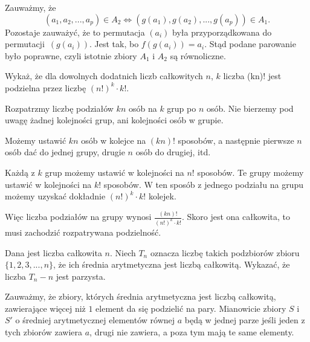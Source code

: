 Zauważmy, że
\[
	(a_1, a_2, ..., a_p) \in A_2 \iff (g(a_1), g(a_2), ..., g(a_p)) \in A_1.
\] 
Pozostaje zauważyć, że to permutacja $(a_i)$ była przyporządkowana do permutacji~$(g(a_i))$. Jest tak, bo $f(g(a_i)) = a_i$. Stąd podane parowanie było poprawne, czyli istotnie zbiory $A_1$ i $A_2$ są równoliczne.


\vspace{5px}

\begin{problem}{5}
	Wykaż, że dla dowolnych dodatnich liczb całkowitych $n$, $k$ liczba	(kn)!
	jest podzielna przez liczbę $(n!)^k \cdot k!$.
\end{problem}

\vspace{5px}

\noindent
Rozpatrzmy liczbę podziałów $kn$ osób na $k$ grup po $n$ osób. Nie bierzemy pod uwagę żadnej kolejności grup, ani kolejności osób w grupie. 

Możemy ustawić $kn$ osób w kolejce na $(kn)!$ sposobów, a następnie pierwsze $n$ osób dać do jednej grupy, drugie $n$ osób do drugiej, itd. 

Każdą z $k$ grup możemy ustawić w kolejności na $n!$ sposobów. Te grupy możemy ustawić w kolejności na $k!$ sposobów. W ten sposób z jednego podziału na grupu możemy uzyskać dokładnie $(n!)^k \cdot k!$ kolejek. 

Więc liczba podziałów na grupy wynosi $\frac{(kn)!}{(n!)^k \cdot k!}$. Skoro jest ona całkowita, to musi zachodzić rozpatrywana podzielność.

\vspace{5px}



\begin{problem}{6}
	Dana jest liczba całkowita $n$. Niech $T_n$ oznacza liczbę takich podzbiorów zbioru $\{1, 2, 3, ..., n\}$, że ich średnia arytmetyczna jest liczbą całkowitą. Wykazać, że liczba $T_n - n$ jest parzysta.
\end{problem}

\vspace{5px}

\noindent
Zauważmy, że zbiory, których średnia arytmetyczna jest liczbą całkowitą, zawierające więcej niż $1$ element da się podzielić na pary. Mianowicie zbiory $S$ i $S'$ o średniej arytmetycznej elementów równej $a$ będą w jednej parze jeśli jeden z tych zbiorów zawiera $a$, drugi nie zawiera, a poza tym mają te same elementy.

